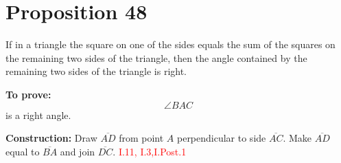 
\section*{Proposition 48}

\begin{thm}
If in a triangle the square on one of the sides equals the sum of the squares on the remaining two sides of the triangle, then the angle contained by the remaining two sides of the triangle is right.
\end{thm}

\textbf{To prove:} $$\angle BAC$$ is a right angle.

\textbf{Construction:} Draw $\overline{AD}$ from point $A$ perpendicular to side $\overline{AC}$. Make $\overline{AD}$ equal to $\overline{BA}$ and join $\overline{DC}$.\hfill\textcolor{red}{ I.11, I.3,I.Post.1}

\begin{figure}[H]
	\caption{}
\end{figure}


